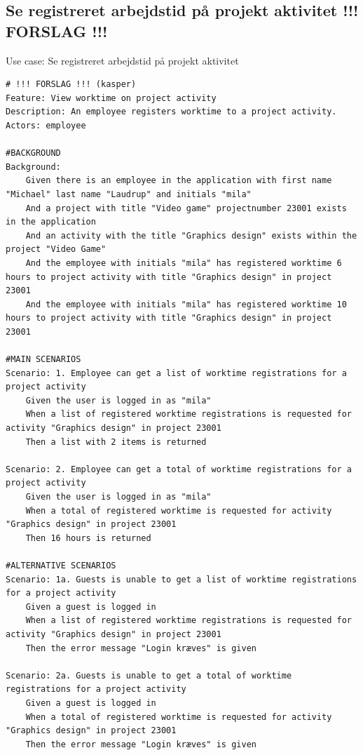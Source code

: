 \subsection{Se registreret arbejdstid på projekt aktivitet !!! FORSLAG !!!}
\begin{listing}[H]
    \centering
    \caption{Use case: Se registreret arbejdstid på projekt aktivitet} \label{lst:usecase_view_worktime_projectactivity}
    \begin{verbatim}  
# !!! FORSLAG !!! (kasper)
Feature: View worktime on project activity
Description: An employee registers worktime to a project activity.
Actors: employee

#BACKGROUND
Background:
    Given there is an employee in the application with first name "Michael" last name "Laudrup" and initials "mila"
    And a project with title "Video game" projectnumber 23001 exists in the application
    And an activity with the title "Graphics design" exists within the project "Video Game"
    And the employee with initials "mila" has registered worktime 6 hours to project activity with title "Graphics design" in project 23001
    And the employee with initials "mila" has registered worktime 10 hours to project activity with title "Graphics design" in project 23001

#MAIN SCENARIOS
Scenario: 1. Employee can get a list of worktime registrations for a project activity
    Given the user is logged in as "mila"
    When a list of registered worktime registrations is requested for activity "Graphics design" in project 23001
    Then a list with 2 items is returned

Scenario: 2. Employee can get a total of worktime registrations for a project activity
    Given the user is logged in as "mila"
    When a total of registered worktime is requested for activity "Graphics design" in project 23001
    Then 16 hours is returned

#ALTERNATIVE SCENARIOS
Scenario: 1a. Guests is unable to get a list of worktime registrations for a project activity
    Given a guest is logged in
    When a list of registered worktime registrations is requested for activity "Graphics design" in project 23001
    Then the error message "Login kræves" is given

Scenario: 2a. Guests is unable to get a total of worktime registrations for a project activity
    Given a guest is logged in
    When a total of registered worktime is requested for activity "Graphics design" in project 23001
    Then the error message "Login kræves" is given

    \end{verbatim}
\end{listing}


